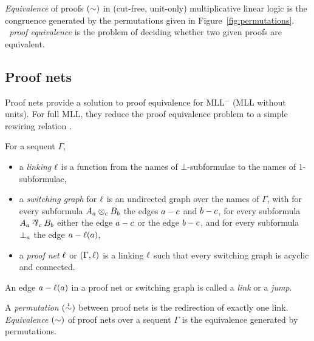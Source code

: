 \documentclass[conference]{IEEEtran}
\begin{document}
\begin{definition}
\label{def:equivalence}
%
\emph{Equivalence} of proofs $(\perm)$ in (cut-free, unit-only) multiplicative linear logic is the congruence generated by the permutations given in Figure~\ref{fig:permutations}.
%
\emph{\MLL\ proof equivalence} is the problem of deciding whether two given proofs are equivalent.
%
\end{definition}



\subsection*{Proof nets}

Proof nets provide a solution to proof equivalence for MLL$^-$ (MLL without units).
%
For full MLL, they reduce the proof equivalence problem to a simple rewiring relation \cite{HughesMLLProofNets}.


\begin{definition}
\label{def:proof nets}
%
For a sequent $\Gamma$,
\begin{itemize}

	\item
	a \emph{linking} $\links$ is a function from the names of $\bot$-subformulae to the names of $1$-subformulae,

	\item
	a \emph{switching graph} for $\links$ is an undirected graph over the names of $\Gamma$, with for every subformula $\named aA\named c\tn\named bB$ the edges $\edge ac$ and $\edge bc$, for every subformula $\named aA\named c\parr\named bB$ either the edge $\edge ac$ or the edge $\edge bc$, and for every subformula $\named a\bot$ the edge $\edge a{\links(a)}$,

 	\item
	a \emph{proof net} $\links$ or $(\Gamma,\links)$ is a linking $\links$ such that every switching graph is acyclic and connected.

\end{itemize}
\end{definition}


\noindent
An edge $\edge a{\links(a)}$ in a proof net or switching graph is called a \emph{link} or a \emph{jump}.



\begin{definition}
\label{def:proof net equivalence}
%
A \emph{permutation} $(\perm*)$ between proof nets is the redirection of exactly one link.
%
\emph{Equivalence} $(\perm)$ of proof nets over a sequent $\Gamma$ is the equivalence generated by permutations.
%
\end{definition}
\end{document}

